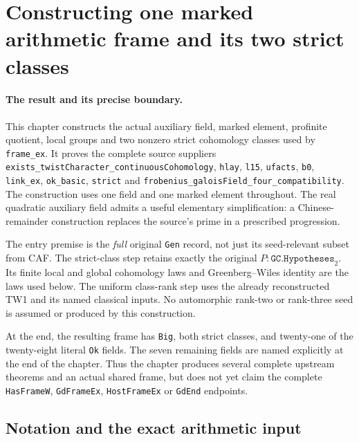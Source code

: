 \section{Constructing one marked arithmetic frame and its two strict classes}
\label{sec:marked-frame-construction}

\paragraph{The result and its precise boundary.}
This chapter constructs the actual auxiliary field, marked element,
profinite quotient, local groups and two nonzero strict cohomology
classes used by \texttt{frame\_ex}.  It proves the complete source
suppliers \texttt{exists\_\allowbreak twistCharacter\_\allowbreak continuousCohomology},
\texttt{hlay}, \texttt{l15}, \texttt{ufacts}, \texttt{b0},
\texttt{link\_ex}, \texttt{ok\_basic}, \texttt{strict} and
\texttt{frobenius\_\allowbreak galoisField\_\allowbreak four\_\allowbreak compatibility}.
The construction uses one field and one marked element throughout.
The real quadratic auxiliary field admits a useful elementary
simplification: a Chinese-remainder construction replaces the
source's prime in a prescribed progression.

The entry premise is the \emph{full} original \texttt{Gen} record,
not just its seed-relevant subset from CAF.  The strict-class step
retains exactly the original \(P:\texttt{GC.Hypotheses}_{2}\).
Its finite local and global cohomology laws and Greenberg--Wiles
identity are the laws used below.  The uniform class-rank step
uses the already reconstructed TW1 and its named classical inputs.
No automorphic rank-two or rank-three seed is assumed or produced
by this construction.

At the end, the resulting frame has \texttt{Big}, both strict
classes, and twenty-one of the twenty-eight literal \texttt{Ok}
fields.  The seven remaining fields are named explicitly at the
end of the chapter.  Thus the chapter produces several complete
upstream theorems and an actual shared frame, but does not yet
claim the complete \texttt{HasFrameW}, \texttt{GdFrameEx},
\texttt{HostFrameEx} or \texttt{GdEnd} endpoints.

\subsection{Notation and the exact arithmetic input}

